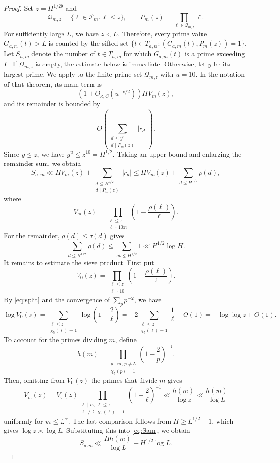 \documentclass[11pt]{amsart}
\theoremstyle{definition}
\theoremstyle{remark}
\begin{document}
\begin{proof}
Set $z=H^{1/20}$ and
\[
\mathcal Q_{m,z}=\{\ell\in\mathcal P_m:\ell\leq z\},
\qquad
P_m(z)=\prod_{\ell\in\mathcal Q_{m,z}}\ell.
\]
For sufficiently large $L$, we have $z<L$.  Therefore, every prime value
$G_{a,m}(t)>L$ is counted by the sifted set
$\{t\in T_{a,m}:(G_{a,m}(t),P_m(z))=1\}$.  Let $S_{a,m}$ denote the number
of $t\in T_{a,m}$ for which $G_{a,m}(t)$ is a prime exceeding $L$.  If
$\mathcal Q_{m,z}$ is empty, the estimate below is immediate.  Otherwise,
let $y$ be its largest prime.  We apply
\cite[Theorem 18.11(a), p.~190]{Koukoulopoulos} to the finite prime set
$\mathcal Q_{m,z}$ with $u=10$.  In the notation of that theorem, its main
term is
\[
\left(1+O_{\kappa,C}(u^{-u/2})\right)H V_m(z),
\]
and its remainder is bounded by
\[
O\left(\sum_{\substack{d\leq y^u\\d\mid P_m(z)}}|r_d|\right).
\]
Since $y\leq z$, we have $y^u\leq z^{10}=H^{1/2}$.  Taking an upper bound
and enlarging the remainder sum, we obtain
\begin{equation}\label{eq:Sam}
S_{a,m}
\ll
HV_m(z)
+\sum_{\substack{d\leq H^{1/2}\\ d\mid P_m(z)}}|r_d|
\leq HV_m(z)+\sum_{d\leq H^{1/2}}\rho(d),
\end{equation}
where
\[
V_m(z)=
\prod_{\substack{\ell\leq z\\ \ell\nmid10m}}
\left(1-\frac{\rho(\ell)}\ell\right).
\]
For the remainder, $\rho(d)\leq\tau(d)$ gives
\[
\sum_{d\leq H^{1/2}}\rho(d)
\leq\sum_{ab\leq H^{1/2}}1
\ll H^{1/2}\log H.
\]
It remains to estimate the sieve product.  First put
\[
V_0(z)=\prod_{\substack{\ell\leq z\\ \ell\nmid10}}
\left(1-\frac{\rho(\ell)}\ell\right).
\]
By \eqref{eq:split} and the convergence of $\sum_p p^{-2}$, we have
\[
\log V_0(z)
=\sum_{\substack{\ell\leq z\\ \chi_5(\ell)=1}}
\log\left(1-\frac2\ell\right)
=-2\sum_{\substack{\ell\leq z\\ \chi_5(\ell)=1}}\frac1\ell+O(1)
=-\log\log z+O(1).
\]
To account for the primes dividing $m$, define
\[
h(m)=
\prod_{\substack{p\mid m,\ p\neq5\\ \chi_5(p)=1}}
\left(1-\frac2p\right)^{-1}.
\]
Then, omitting from $V_0(z)$ the primes that divide $m$ gives
\[
V_m(z)
=V_0(z)
\prod_{\substack{\ell\mid m,\ \ell\leq z\\
\ell\neq5,\ \chi_5(\ell)=1}}
\left(1-\frac2\ell\right)^{-1}
\ll\frac{h(m)}{\log z}
\ll\frac{h(m)}{\log L}
\]
uniformly for $m\leq L^\alpha$.  The last comparison follows from
$H\geq L^{1/2}-1$, which gives $\log z\asymp\log L$.  Substituting this into
\eqref{eq:Sam}, we obtain
\begin{equation}\label{eq:Sam2}
S_{a,m}
\ll
\frac{Hh(m)}{\log L}+H^{1/2}\log L.
\end{equation}


\end{proof}
\end{document}
